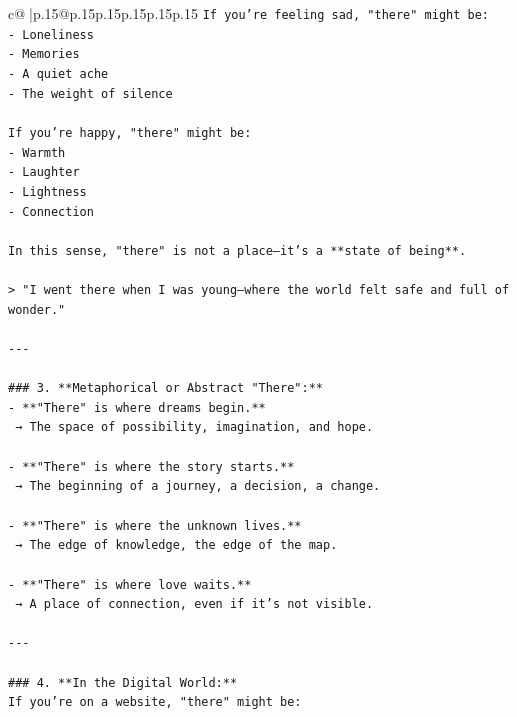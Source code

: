 \documentclass{article}
\begin{document}
{\begin{supertabular}{c@{$\;$}|p{.15\linewidth}@{}p{.15\linewidth}p{.15\linewidth}p{.15\linewidth}p{.15\linewidth}p{.15\linewidth}}
{{{\texttt{If you're feeling sad, "there" might be:} \\
\texttt{{-} Loneliness} \\
\texttt{{-} Memories} \\
\texttt{{-} A quiet ache} \\
\texttt{{-} The weight of silence} \\
\\ 
\texttt{If you're happy, "there" might be:} \\
\texttt{{-} Warmth} \\
\texttt{{-} Laughter} \\
\texttt{{-} Lightness} \\
\texttt{{-} Connection} \\
\\ 
\texttt{In this sense, "there" is not a place—it’s a **state of being**.} \\
\\ 
\texttt{> "I went there when I was young—where the world felt safe and full of wonder."} \\
\\ 
\texttt{{-}{-}{-}} \\
\\ 
\texttt{\#\#\# 3. **Metaphorical or Abstract "There":**} \\
\texttt{{-} **"There" is where dreams begin.**  } \\
\texttt{  → The space of possibility, imagination, and hope.} \\
\\ 
\texttt{{-} **"There" is where the story starts.**  } \\
\texttt{  → The beginning of a journey, a decision, a change.} \\
\\ 
\texttt{{-} **"There" is where the unknown lives.**  } \\
\texttt{  → The edge of knowledge, the edge of the map.} \\
\\ 
\texttt{{-} **"There" is where love waits.**  } \\
\texttt{  → A place of connection, even if it’s not visible.} \\
\\ 
\texttt{{-}{-}{-}} \\
\\ 
\texttt{\#\#\# 4. **In the Digital World:**} \\
\texttt{If you're on a website, "there" might be:} \\
}}}
\end{supertabular}}
\end{document}
